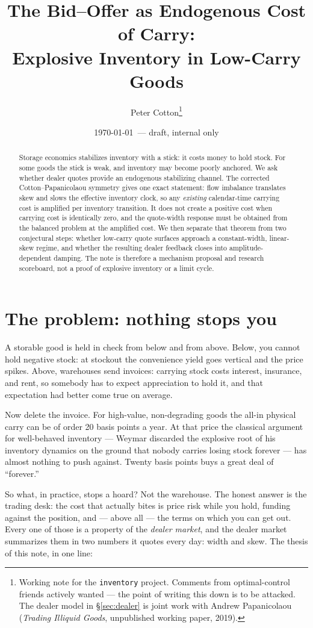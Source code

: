 \documentclass[11pt]{article}
\title{The Bid--Offer as Endogenous Cost of Carry:\\
Explosive Inventory in Low-Carry Goods}
\author{Peter Cotton\thanks{Working note for the \texttt{inventory} project. Comments from optimal-control friends actively wanted --- the point of writing this down is to be attacked. The dealer model in \S\ref{sec:dealer} is joint work with Andrew Papanicolaou (\emph{Trading Illiquid Goods}, unpublished working paper, 2019).}}
\date{\today\ --- draft, internal only}
\begin{document}
\maketitle

\begin{abstract}
Storage economics stabilizes inventory with a stick: it costs money to hold stock. For some goods the stick is weak, and inventory may become poorly anchored. We ask whether dealer quotes provide an endogenous stabilizing channel. The corrected Cotton--Papanicolaou symmetry gives one exact statement: flow imbalance translates skew and slows the effective inventory clock, so any \emph{existing} calendar-time carrying cost is amplified per inventory transition. It does not create a positive cost when carrying cost is identically zero, and the quote-width response must be obtained from the balanced problem at the amplified cost. We then separate that theorem from two conjectural steps: whether low-carry quote surfaces approach a constant-width, linear-skew regime, and whether the resulting dealer feedback closes into amplitude-dependent damping. The note is therefore a mechanism proposal and research scoreboard, not a proof of explosive inventory or a limit cycle.
\end{abstract}

\section{The problem: nothing stops you}

A storable good is held in check from below and from above. Below, you cannot hold negative stock: at stockout the convenience yield goes vertical and the price spikes. Above, warehouses send invoices: carrying stock costs interest, insurance, and rent, so somebody has to expect appreciation to hold it, and that expectation had better come true on average.

Now delete the invoice. For high-value, non-degrading goods the all-in physical carry can be of order 20 basis points a year. At that price the classical argument for well-behaved inventory --- Weymar discarded the explosive root of his inventory dynamics on the ground that nobody carries losing stock forever --- has almost nothing to push against. Twenty basis points buys a great deal of ``forever.''

So what, in practice, stops a hoard? Not the warehouse. The honest answer is the trading desk: the cost that actually bites is price risk while you hold, funding against the position, and --- above all --- the terms on which you can get out. Every one of those is a property of the \emph{dealer market}, and the dealer market summarizes them in two numbers it quotes every day: width and skew. The thesis of this note, in one line:
\end{document}
